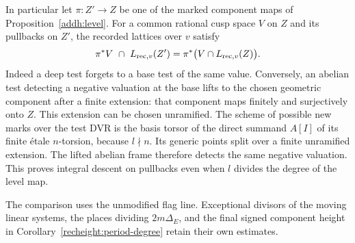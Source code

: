 In particular let \(\pi:Z'\to Z\) be one of the marked component
maps of Proposition~\ref{addh:level}. For a common rational cusp
space \(V\) on \(Z\) and its pullbacks on \(Z'\), the recorded
lattices over \(v\) satisfy
\[
       \pi^* V\ \cap\ L_{{\rm rec},v}(Z')
                    =\pi^*\bigl(V\cap L_{{\rm rec},v}(Z)\bigr).
\]
Indeed a deep test forgets to a base test of the same value.
Conversely, an abelian test detecting a negative valuation at the
base lifts to the chosen geometric component after a finite extension:
that component maps finitely and surjectively onto \(Z\). This extension
can be chosen unramified. The scheme of possible new marks over the
test DVR is the basis torsor of the direct summand \(A[I]\) of its
finite \'etale \(n\)-torsion, because \(l\nmid n\). Its generic
points split over a finite unramified extension. The lifted abelian
frame therefore detects the same negative valuation. This proves
integral descent on pullbacks even when \(l\) divides the degree
of the level map.

The comparison uses the unmodified flag line.
Exceptional divisors of the moving linear systems, the places
dividing \(2m\Delta_E\), and the final signed component height in
Corollary~\ref{recheight:period-degree} retain their own estimates.
